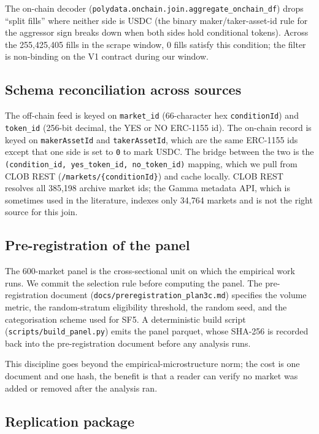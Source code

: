 The on-chain decoder
(\texttt{polydata.\allowbreak onchain.\allowbreak join.\allowbreak aggregate\_onchain\_df})
drops
``split fills'' where neither side is USDC (the binary
maker/taker-asset-id rule for the aggressor sign breaks down when
both sides hold conditional tokens). Across the 255{,}425{,}405
fills in the scrape window, 0 fills satisfy this condition; the
filter is non-binding on the V1 contract during our window.

\subsection{Schema reconciliation across sources}

The off-chain feed is keyed on \texttt{market\_id} (66-character
hex \texttt{conditionId}) and \texttt{token\_id} (256-bit decimal,
the YES or NO ERC-1155 id). The on-chain record is keyed on
\texttt{makerAssetId} and \texttt{takerAssetId}, which are the same
ERC-1155 ids except that one side is set to \texttt{0} to mark
USDC. The bridge between the two is the
\texttt{(condition\_id, yes\_token\_id, no\_token\_id)} mapping,
which we pull from CLOB REST
(\texttt{/markets/\{conditionId\}}) and cache locally. CLOB REST
resolves all 385{,}198 archive market ids; the Gamma metadata API,
which is sometimes used in the literature, indexes only 34{,}764
markets and is not the right source for this join.

\subsection{Pre-registration of the panel}

The 600-market panel is the cross-sectional unit on which the
empirical work runs. We commit the selection rule before computing
the panel. The pre-registration document
(\texttt{docs/preregistration\_plan3c.md}) specifies the volume
metric, the random-stratum eligibility threshold, the random seed,
and the categorisation scheme used for SF5. A deterministic build
script (\texttt{scripts/build\_panel.py}) emits the panel parquet,
whose SHA-256 is recorded back into the pre-registration document
before any analysis runs.

This discipline goes beyond the empirical-microstructure norm; the
cost is one document and one hash, the benefit is that a reader can
verify no market was added or removed after the analysis ran.

\subsection{Replication package}

